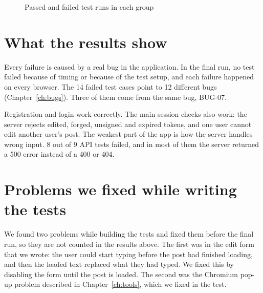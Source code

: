 \documentclass[12pt,a4paper,oneside]{report}
\begin{document}
\begin{figure}[H]
\centering
{}
\caption{Passed and failed test runs in each group}
\end{figure}

\section*{What the results show}

Every failure is caused by a real bug in the application. In the final run, no
test failed because of timing or because of the test setup, and each failure
happened on every browser. The 14 failed test cases point to 12 different bugs
(Chapter~\ref{ch:bugs}). Three of them come from the same bug, BUG-07.

Registration and login work correctly. The main session checks also work: the
server rejects edited, forged, unsigned and expired tokens, and one user cannot
edit another user's post. The weakest part of the app is how the server handles
wrong input. 8 out of 9 API tests failed, and in most of them the server
returned a 500 error instead of a 400 or 404.

\section*{Problems we fixed while writing the tests}

We found two problems while building the tests and fixed them before the final
run, so they are not counted in the results above. The first was in the edit
form that we wrote: the user could start typing before the post had finished
loading, and then the loaded text replaced what they had typed. We fixed this
by disabling the form until the post is loaded. The second was the Chromium
pop-up problem described in Chapter~\ref{ch:tools}, which we fixed in the test.
\end{document}
